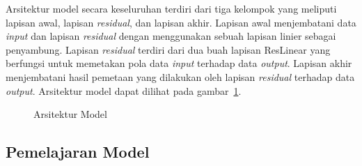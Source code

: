 Arsitektur model secara keseluruhan terdiri dari tiga kelompok yang meliputi lapisan awal, lapisan
\textit{residual}, dan lapisan akhir. Lapisan awal menjembatani data \textit{input} dan lapisan \textit{residual}
dengan menggunakan sebuah lapisan linier sebagai penyambung. Lapisan \textit{residual} terdiri dari
dua buah lapisan ResLinear yang berfungsi untuk memetakan pola data \textit{input} terhadap data \textit{output}.
Lapisan akhir menjembatani hasil pemetaan yang dilakukan oleh lapisan \textit{residual} terhadap data \textit{output}.
Arsitektur model dapat dilihat pada gambar~\ref{fig:arsitektur}.

\begin{figure}[htbp]
    \begin{center}
    \end{center}
    \vspace{-20pt}
    \captionsetup{labelfont=bf, textfont=bf}
    \caption{Arsitektur Model}
    \vspace{-10pt}
    \captionsetup{labelfont=md, textfont=md}
    \label{fig:arsitektur}
\end{figure}

\subsection{Pemelajaran Model}

